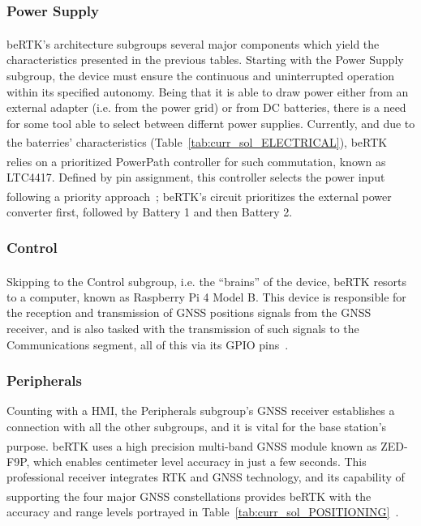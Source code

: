 \subsubsection{Power Supply}\label{sec:II_architecture_PowerSupply}

beRTK\textsuperscript{\textregistered}'s architecture subgroups several major components which yield the characteristics presented in the previous tables. Starting with the Power Supply subgroup, the device must ensure the continuous and uninterrupted operation within its specified autonomy. Being that it is able to draw power either from an external adapter (i.e. from the power grid) or from DC batteries, there is a need for some tool able to select between differnt power supplies. Currently, and due to the baterries' characteristics (Table~\ref{tab:curr_sol_ELECTRICAL}), beRTK\textsuperscript{\textregistered} relies on a prioritized PowerPath\textsuperscript{\texttrademark} controller for such commutation, known as LTC4417. Defined by pin assignment, this controller selects the power input following a priority approach~\cite{LTC4417}; beRTK\textsuperscript{\textregistered}'s circuit prioritizes the external power converter first, followed by Battery 1 and then Battery 2.

\subsubsection{Control}\label{sec:II_architecture_Control}

Skipping to the Control subgroup, i.e. the ``brains'' of the device, beRTK\textsuperscript{\textregistered} resorts to a computer, known as Raspberry Pi 4 Model B. This device is responsible for the reception and transmission of GNSS positions signals from the GNSS receiver, and is also tasked with the transmission of such signals to the Communications segment, all of this via its \gls{GPIO} pins~\cite{RPi4B}.

\subsubsection{Peripherals}\label{sec:II_architecture_Peripherals}

Counting with a \gls{HMI}, the Peripherals subgroup's GNSS receiver establishes a connection with all the other subgroups, and it is vital for the base station's purpose. beRTK\textsuperscript{\textregistered} uses a high precision multi-band GNSS module known as ZED-F9P, which enables centimeter level accuracy in just a few seconds. This professional receiver integrates RTK and GNSS technology, and its capability of supporting the four major GNSS constellations provides beRTK\textsuperscript{\textregistered} with the accuracy and range levels portrayed in Table~\ref{tab:curr_sol_POSITIONING}~\cite{ZED_F9P}.

